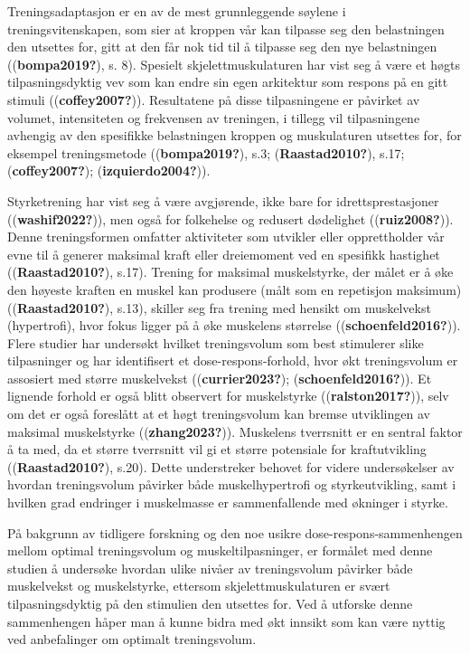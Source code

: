 \documentclass[
  letterpaper,
  DIV=11,
  numbers=noendperiod]{scrreprt}
\begin{document}
Treningsadaptasjon er en av de mest grunnleggende søylene i
treningsvitenskapen, som sier at kroppen vår kan tilpasse seg den
belastningen den utsettes for, gitt at den får nok tid til å tilpasse
seg den nye belastningen ((\textbf{bompa2019?}), s. 8). Spesielt
skjelettmuskulaturen har vist seg å være et høgts tilpasningsdyktig vev
som kan endre sin egen arkitektur som respons på en gitt stimuli
((\textbf{coffey2007?})). Resultatene på disse tilpasningene er påvirket
av volumet, intensiteten og frekvensen av treningen, i tillegg vil
tilpasningene avhengig av den spesifikke belastningen kroppen og
muskulaturen utsettes for, for eksempel treningsmetode
((\textbf{bompa2019?}), s.3; (\textbf{Raastad2010?}), s.17;
(\textbf{coffey2007?}); (\textbf{izquierdo2004?})).

Styrketrening har vist seg å være avgjørende, ikke bare for
idrettsprestasjoner ((\textbf{washif2022?})), men også for folkehelse og
redusert dødelighet ((\textbf{ruiz2008?})). Denne treningsformen
omfatter aktiviteter som utvikler eller opprettholder vår evne til å
generer maksimal kraft eller dreiemoment ved en spesifikk hastighet
((\textbf{Raastad2010?}), s.17). Trening for maksimal muskelstyrke, der
målet er å øke den høyeste kraften en muskel kan produsere (målt som en
repetisjon maksimum) ((\textbf{Raastad2010?}), s.13), skiller seg fra
trening med hensikt om muskelvekst (hypertrofi), hvor fokus ligger på å
øke muskelens størrelse ((\textbf{schoenfeld2016?})). Flere studier har
undersøkt hvilket treningsvolum som best stimulerer slike tilpasninger
og har identifisert et dose-respons-forhold, hvor økt treningsvolum er
assosiert med større muskelvekst ((\textbf{currier2023?});
(\textbf{schoenfeld2016?})). Et lignende forhold er også blitt observert
for muskelstyrke ((\textbf{ralston2017?})), selv om det er også
foreslått at et høgt treningsvolum kan bremse utviklingen av maksimal
muskelstyrke ((\textbf{zhang2023?})). Muskelens tverrsnitt er en sentral
faktor å ta med, da et større tverrsnitt vil gi et større potensiale for
kraftutvikling ((\textbf{Raastad2010?}), s.20). Dette understreker
behovet for videre undersøkelser av hvordan treningsvolum påvirker både
muskelhypertrofi og styrkeutvikling, samt i hvilken grad endringer i
muskelmasse er sammenfallende med økninger i styrke.

På bakgrunn av tidligere forskning og den noe usikre
dose-respons-sammenhengen mellom optimal treningsvolum og
muskeltilpasninger, er formålet med denne studien å undersøke hvordan
ulike nivåer av treningsvolum påvirker både muskelvekst og muskelstyrke,
ettersom skjelettmuskulaturen er svært tilpasningsdyktig på den
stimulien den utsettes for. Ved å utforske denne sammenhengen håper man
å kunne bidra med økt innsikt som kan være nyttig ved anbefalinger om
optimalt treningsvolum.
\end{document}
